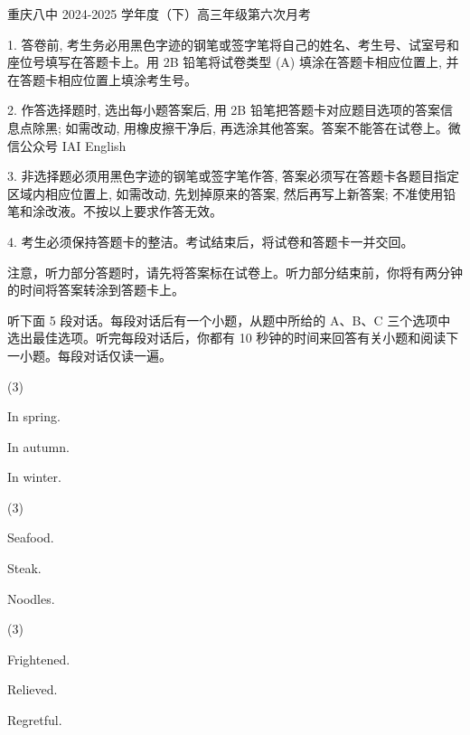 \documentclass{英语试卷}
\begin{document}
\par 重庆八中 2024-2025 学年度（下）高三年级第六次月考\par
\begin{notice}
\par 1. 答卷前, 考生务必用黑色字迹的钢笔或签字笔将自己的姓名、考生号、试室号和座位号填写在答题卡上。用 2B 铅笔将试卷类型 (A) 填涂在答题卡相应位置上, 并在答题卡相应位置上填涂考生号。\par
\par 2. 作答选择题时, 选出每小题答案后, 用 2B 铅笔把答题卡对应题目选项的答案信息点除黑; 如需改动, 用橡皮擦干净后, 再选涂其他答案。答案不能答在试卷上。微信公众号 IAI English\par
\par 3. 非选择题必须用黑色字迹的钢笔或签字笔作答, 答案必须写在答题卡各题目指定区域内相应位置上, 如需改动, 先划掉原来的答案, 然后再写上新答案; 不准使用铅笔和涂改液。不按以上要求作答无效。\par
\par 4. 考生必须保持答题卡的整洁。考试结束后，将试卷和答题卡一并交回。\par
\end{notice}
\par 注意，听力部分答题时，请先将答案标在试卷上。听力部分结束前，你将有两分钟的时间将答案转涂到答题卡上。\par
{}
\par 听下面 5 段对话。每段对话后有一个小题，从题中所给的 A、B、C 三个选项中选出最佳选项。听完每段对话后，你都有 10 秒钟的时间来回答有关小题和阅读下一小题。每段对话仅读一遍。\par
{}
\begin{choices}(3)
  \item In spring.
  \item In autumn.
  \item In winter.
\end{choices}
\begin{choices}(3)
  \item Seafood.
  \item Steak.
  \item Noodles.
\end{choices}
\begin{choices}(3)
  \item Frightened.
  \item Relieved.
  \item Regretful.
\end{choices}
\end{document}
